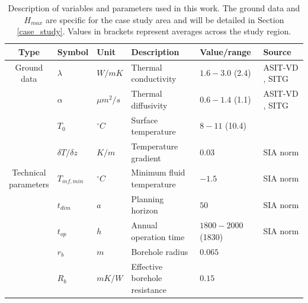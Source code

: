 \begin{landscape}
\begin{table}[b]
\footnotesize
\caption{Description of variables and parameters used in this work. The ground data and $H_{max}$ are specific for the case study area and will be detailed in Section \ref{case_study}. Values in brackets represent averages across the study region.}
\centering
\begin{tabular}{clllll}
\hline
\textbf{Type} & \textbf{Symbol}             & \textbf{Unit} & \textbf{Description}           & \textbf{Value/range} & \textbf{Source} \\ \hline
\multirowcell{4}{Ground \\ data}
& $\lambda$           & $W/mK$        & Thermal conductivity         & $1.6-3.0$ (2.4) 
& ASIT-VD \cite{asit_vd_cadastre_2019-1}, SITG \cite{sitg_cadastre_2019}      \\
& $\alpha$            & $\mu m^2/s$       & Thermal diffusivity          & $0.6-1.4$ (1.1)   
& ASIT-VD \cite{asit_vd_cadastre_2019-1}, SITG \cite{sitg_cadastre_2019}            \\
& $T_0$               & $^\circ C$    & Surface temperature          & $8 - 11$ (10.4)  
& \citet{assouline_machine_2019}              \\
& $\delta T/\delta z$ & $K/m$         & Temperature gradient         & 0.03     
& SIA norm \cite{sia_sondes_2010} \\
\hline
\multirowcell{6}{Technical \\ parameters}
& $T_{mf, min}$      & $^\circ C$    & Minimum fluid temperature     & $- 1.5$      
& SIA norm \cite{sia_sondes_2010}  \\
& $t_{dim}$          & $a$           & Planning horizon              & $50$               
& SIA norm \cite{sia_sondes_2010}  \\ 
& $t_{op}$           & $h$           & Annual operation time         & $1800-2000$ (1830)
& SIA norm \cite{sia_sondes_2010}  \\
& $r_b$              & $m$           & Borehole radius               & $0.065$           
& \citet{perego_techno-economic_2019, miglani_methodology_2018} \\
& $R_b$            & $mK/W$        & Effective borehole resistance & $0.15$     
& \citet{rivera_increased_2017}  \\ 

\end{tabular}
\end{table}
\end{landscape}
